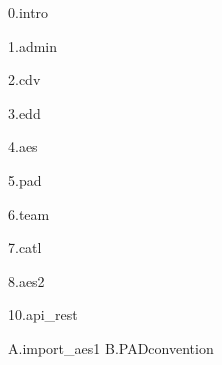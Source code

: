 \documentclass{ONEreport}
\begin{document}


{0.intro}

{1.admin}

{2.cdv}

{3.edd}

{4.aes}

{5.pad}

{6.team}

{7.catl}

{8.aes2}


%

{10.api_rest}

\begin{appendices}
{A.import_aes1}
{B.PADconvention}




\end{appendices}

	\newpage
	\thispagestyle{empty}
    \strut
\end{document}
